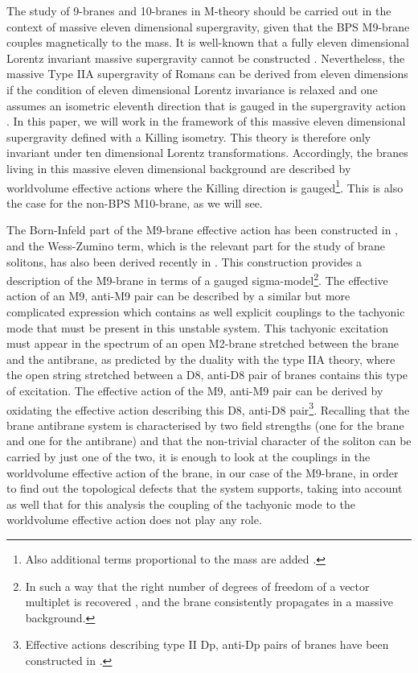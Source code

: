 \documentclass[12pt,a4paper]{article}
\begin{document}
The study of 9-branes and 10-branes in M-theory should be carried out in the 
context of massive eleven dimensional supergravity, given that the
BPS M9-brane couples magnetically to the mass. It is well-known 
that a fully eleven dimensional Lorentz invariant massive 
supergravity cannot be constructed \cite{BDHS}. Nevertheless, the massive
Type IIA supergravity of Romans \cite{Romans} can be derived from
eleven dimensions if the condition of eleven dimensional Lorentz
invariance is relaxed and one assumes an isometric
eleventh direction that is gauged in the supergravity action
\cite{BLO}. In this paper, we will work in the framework of this massive 
eleven dimensional supergravity defined with a Killing isometry.
This theory is therefore only invariant under ten
dimensional Lorentz transformations. Accordingly, the branes living
in this massive eleven dimensional background are described by
worldvolume effective actions where the Killing direction is 
gauged\footnote{Also additional terms proportional to the mass are 
added \cite{BLO}.}. This is also
the case for the non-BPS M10-brane, as we will see.

The Born-Infeld part of the M9-brane effective action has been constructed
in \cite{BvdS, EL1}, and the Wess-Zumino term, which is the
relevant part for the study of brane solitons, has also been derived
recently in \cite{Sato}. This 
construction provides a description of the M9-brane in terms of
a gauged sigma-model\footnote{In such a way that the right number of 
degrees of freedom of a vector multiplet is recovered
\cite{BvdS}, and the brane consistently propagates in a massive
background.}.
The effective action of an M9, anti-M9 pair can be described by a 
similar but more complicated expression which contains as well 
explicit couplings to the tachyonic mode that must be present in this
unstable system. This tachyonic excitation must appear in the spectrum
of an open M2-brane stretched between the brane and the antibrane,
as predicted by the duality with the type IIA theory, where the open
string stretched between a D8, anti-D8 pair of branes contains this
type of excitation. The effective action of the M9, anti-M9 pair
can be derived by oxidating the effective action describing this
D8, anti-D8 pair\footnote{Effective actions describing type II
Dp, anti-Dp pairs of branes have been constructed in \cite{KW}.}.
Recalling that the brane antibrane system is characterised
by two field strengths (one for the brane and one for the antibrane)
and that the non-trivial character of 
the soliton can be carried by just one of the two,  
it is enough to look at the couplings in the worldvolume effective
action of the brane, in our case of the M9-brane, 
in order to find out the topological defects that the system 
supports, taking into account as well that for this analysis the
coupling of the tachyonic mode to the worldvolume effective action
does not play any role.
\end{document}
